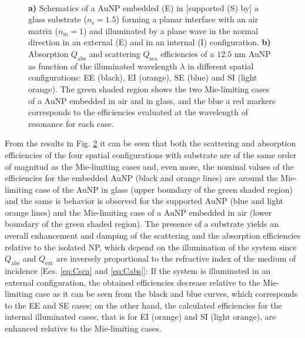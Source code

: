 \begin{figure}[b!]
    \hspace*{-19.15em}%
    \vspace*{-1.25em}%
        \begin{subfigure}{.385\textwidth}\caption{ }\label{sfig:TotallyNormal:1}\end{subfigure}%
        \begin{subfigure}{.25\textwidth}\caption{ }\label{sfig:TotallyNormal:2}\end{subfigure} \\
    \def\svgwidth{.95\textwidth}
    \small
    \centering
    \vspace*{0em}
    \caption[Absorption and Scattering Efficiencies of a 12.5 nm AuNP above and below a planar Interface Illuminated at Normal Incidence]{\textbf{a)} Schematics of a AuNP embedded (E) in [supported (S) by] a glass substrate ($n_\text{s} = 1.5$) forming a planar interface with an air matrix ($n_\text{m} = 1$) and illuminated by a plane wave in the normal direction in an external (E) and in an internal (I) configuration. \textbf{b)} Absorption $Q_\text{abs}$ and scattering $Q_\text{sca}$ efficiencies of a $12.5$ nm AuNP as function of the illuminated wavelength $\lambda$ in different spatial configurations: EE (black), EI (orange), SE (blue) and SI (light orange). The green shaded region shows the two Mie-limiting cases of a  AuNP embedded in air and in glass, and the blue a red markers corresponds to the efficiencies evaluated at the wavelength of resonance for each case.
    }
\label{fig:TotallyNormal}
\end{figure}

From the results in Fig. \ref{sfig:TotallyNormal:2} it can be seen that both the scattering and absorption efficiencies of the four spatial configurations with substrate are of the same order of magnitud as the Mie-limiting cases and, even more, the nominal values of the efficiencies for the embedded AuNP (black and orange lines) are around the Mie-limiting case of the AuNP in glass (upper boundary of the green shaded region) and the same is behavior is observed for the supported AuNP (blue and light orange lines) and the Mie-limiting case of a AuNP embedded in air (lower boundary of the green shaded region). The presence of a substrate yields an overall enhancement and damping of the scattering and the absorption efficiencies relative to the isolated NP, which depend on the illumination of the system since $Q_\text{abs}$ and $Q_\text{ext}$ are inversely proportional to the refractive index of the medium of incidence [Ecs. \eqref{eq:Csca} and \eqref{eq:Cabs}]: If the system is illuminated in an external configuration, the obtained efficiencies decrease relative to the Mie-limiting case as it can be seen from the black  and blue curves, which corresponds to the EE and SE cases; on the other hand, the calculated efficiencies for the internal illuminated cases, that is for EI (orange) and SI (light orange), are enhanced relative to the Mie-limiting cases.

